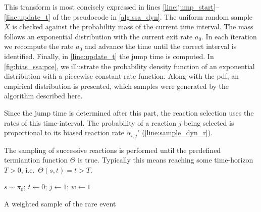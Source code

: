 This transform is most concisely expressed in lines \ref{line:jump_start}--\ref{line:update_t} of the pseudocode in \autoref{alg:ssa_dyn}.
The uniform random sample $X$ is checked against the probability mass of the current time interval.
The mass follows an exponential distribution with the current exit rate $a_0$.
In each iteration we recompute the rate $a_0$ and advance the time until the correct interval is identified.
Finally, in \autoref{line:update_t} the jump time is computed.
In \autoref{fig:bias_ssa:pce}, we illustrate the probability density function of an exponential distribution with a piecewise constant rate function.
Along with the pdf, an empirical distribution is presented, which samples were generated by the algorithm described here.

Since the jump time is determined after this part, the reaction selection uses the rates of this time-interval.
The probability of a reaction $j$ being selected is proportional to its biased reaction rate $\alpha_{i,j}'$ (\autoref{line:sample_dyn_r}).

The sampling of successive reactions is performed until the predefined termiantion function $\Theta$ is true.
Typically this means reaching some time-horizon $T>0$, i.e.\ $\Theta(s, t)=t>T$.
\begin{algorithm}
    $s\sim\pi_0$; $t\leftarrow 0$; $j\leftarrow 1$; $w\leftarrow 1$\;
    \caption{\label{alg:ssa_dyn}A weighted sample of the rare event}
\end{algorithm}

